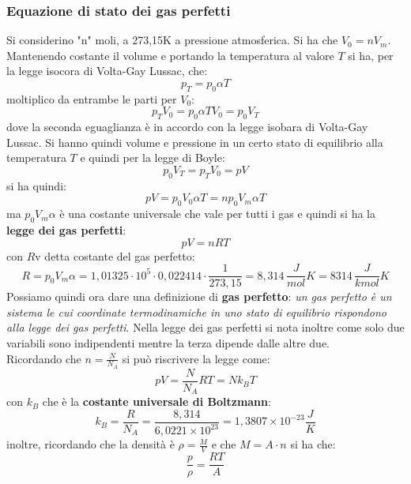 \documentclass[a4paper,12pt, oneside]{book}
\begin{document}
\subsubsection{Equazione di stato dei gas perfetti}
Si considerino "n" moli, a 273,15K a pressione atmosferica. Si ha che $V_0=nV_m$. Mantenendo costante il volume e portando la temperatura al valore $T$ si ha, per la legge isocora di Volta-Gay Lussac, che:
$$p_T=p_0\alpha T$$
moltiplico da entrambe le parti per $V_0$:
$$p_TV_0=p_0\alpha TV_0=p_0V_T$$
dove la seconda eguaglianza è in accordo con la legge isobara di Volta-Gay Lussac. Si hanno quindi volume e pressione in un certo stato di equilibrio alla temperatura $T$ e quindi per la legge di Boyle:
$$p_0V_T=p_TV_0=pV$$
si ha quindi:
$$pV=p_0V_0\alpha T=np_0V_m\alpha T$$
ma $p_0V_m\alpha$ è una costante universale che vale per tutti i gas e quindi si ha la \textbf{legge dei gas perfetti}:
$$pV=nRT$$
con $R$v detta costante del gas perfetto:
$$R=p_0V_m\alpha=1,01325\cdot 10^5\cdot 0,022414\cdot \frac{1}{273,15}=8,314\,\frac{J}{mol}K=8314\,\frac{J}{kmol}K$$
Possiamo quindi ora dare una definizione di \textbf{gas perfetto}: \textit{un gas perfetto è un sistema le cui coordinate termodinamiche in uno stato di equilibrio rispondono alla legge dei gas perfetti}. Nella legge dei gas perfetti si nota inoltre come solo due variabili sono indipendenti mentre la terza dipende dalle altre due.\\
Ricordando che $n=\frac{N}{N_A}$ si può riscrivere la legge come:
$$pV=\frac{N}{N_A}RT=Nk_BT$$
con $k_B$ che è la \textbf{costante universale di Boltzmann}:
$$k_B=\frac{R}{N_A}=\frac{8,314}{6,0221\times 10^{23}}=1,3807\times 10^{-23}\frac{J}{K}$$
inoltre, ricordando che la densità è $\rho=\frac{M}{V}$ e che $M=A\cdot n$ si ha che:
$$\frac{p}{\rho}=\frac{RT}{A}$$
\end{document}
